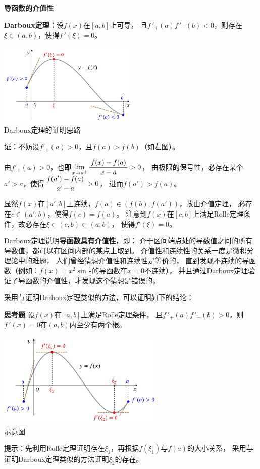 \begin{shaded}
	{\bf 导函数的介值性}
	
	{\bf Darboux定理：}设$f(x)$在$[a,b]$上可导，
	且$f\,'_+(a)f\,'_-(b)<0$，则存在$\xi\in(a,b)$，使得$f\,'(\xi)=0$。

	\begin{center}
		\includegraphics[width=0.5\textwidth]
		{./images/ch03/DarbouxTh.pdf}\\
		\kaishu Darboux定理的证明思路
	\end{center}
	
	证：不妨设$f'_+(a)>0$，且$f(a)>f(b)$（如左图）。
	
	由$f'_+(a)>0$，也即$\lim\limits_{x\to{a^+}}\displaystyle\frac{\,{f(x)-f(a)}\,}{\,{x-a}\,}>0$，
	由极限的保号性，必存在某个$a'>a$，使得$\displaystyle\frac{\,{f(a')-f(a)}\,}{\,{a'-a}\,}>0$，
	进而$f(a')>f(a)$。
	
	显然$f(x)$在$[a',b]$上连续，$f(a)\in(f(b),f(a'))$，故由介值定理，
	必存在$c\in(a',b)$，使得$f(c)=f(a)$。
	注意到$f(x)$在$[c,b]$上满足Rolle定理条件，故必存在$\xi\in(c,b)\subset(a,b)$，
	使得$f'(\xi)=0$。\fin
	
	\bs
	Darboux定理说明{\bf 导函数具有介值性}，即：
	介于区间端点处的导数值之间的所有
	导数值，都可以在区间内部的某点上取到。
	介值性和连续性的关系一度是微积分理论中的难题，
	人们曾经猜想介值性和连续性是等价的，
	直到发现不连续的导函数（例如：$f(x)=x^2\sin\frac1x$的导函数在$x=0$不连续），
	并且通过Darboux定理验证了导函数的介值性，才发现这个猜想是错误的。
	
	采用与证明Darboux定理类似的方法，可以证明如下的结论：
	
	{\bf 思考题} 设$f(x)$在$[a,b]$上满足Rolle定理条件，
	且$f\,'_+(a)f\,'_-(b)>0$，则$f\,'(x)=0$在$(a,b)$内至少有两个根。
	
	\begin{center}
		\includegraphics[width=0.6\textwidth]
		{./images/ch03/Darboux2.pdf}\\
		\kaishu 示意图
	\end{center}
	
	提示：先利用Rolle定理证明存在$\xi_1$，再根据$f(\xi_1)$与$f(a)$的大小关系，
	采用与证明Darboux定理类似的方法证明$\xi_2$的存在。
\end{shaded}

